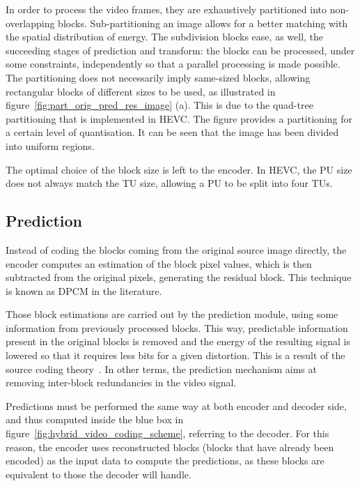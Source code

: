 \documentclass[11pt,a4paper,openright,twoside]{book}
\numberwithin{equation}{section} %
\numberwithin{figure}{section} %
\numberwithin{table}{section} %
\begin{document}
In order to process the video frames, they are exhaustively partitioned into
non-overlapping blocks.
Sub-partitioning an image allows for a better matching with the spatial
distribution of energy.
The subdivision blocks ease, as well,  the succeeding stages of prediction and
transform:
the blocks can be processed, under some constraints, independently so that a
parallel processing is made possible.
The partitioning does not necessarily imply same-sized blocks, allowing
rectangular blocks of different sizes to be used, as illustrated in
figure~\ref{fig:part_orig_pred_res_image} (a).
This is due to the quad-tree partitioning that is implemented in \ac{HEVC}.
The figure provides a partitioning for a certain level of quantisation.
It can be seen that the image has been divided into uniform regions.

The optimal choice of the block size is left to the encoder.
In \ac{HEVC}, the \ac{PU} size does not always match the \ac{TU} size,
allowing a \ac{PU} to be split into four \acp{TU}.

\subsection{Prediction}
\label{sub:prediction}

Instead of coding the blocks coming from the original source image directly,
the encoder computes an estimation of the block pixel values, which is then
subtracted from the original pixels, generating the residual block.
This technique is known as \ac{DPCM} in the literature.

Those block estimations are carried out by the prediction module, using some
information from previously processed blocks.
This way, predictable information present in the original blocks is removed
and the energy of the resulting signal is lowered so that it requires less
bits for a given distortion.
This is a result of the source coding
theory~\cite{jayant-84-digital-coding-waveforms}.
In other terms, the prediction mechanism aims at removing inter-block
redundancies in the video signal.

Predictions must be performed the same way at both encoder and decoder side,
and thus computed inside the blue box in
figure~\ref{fig:hybrid_video_coding_scheme}, referring to the decoder.
For this reason, the encoder uses reconstructed blocks (blocks that have
already been encoded) as the input data to compute the predictions, as these
blocks are equivalent to those the decoder will handle.
\end{document}
